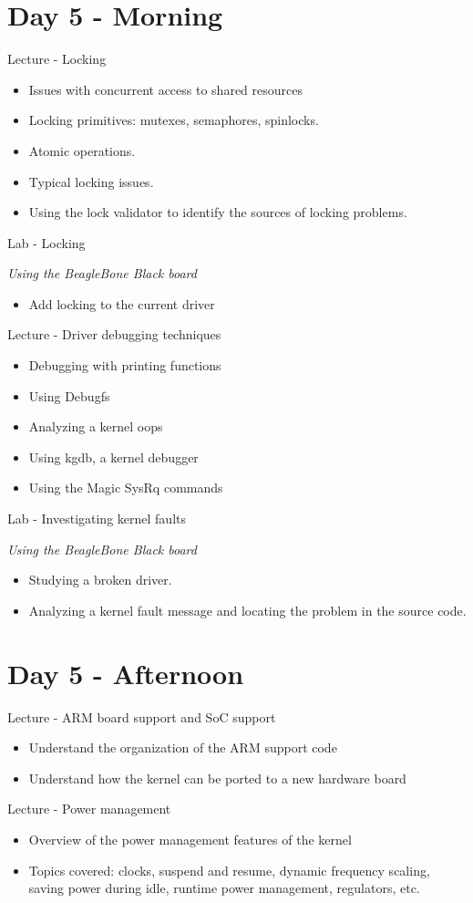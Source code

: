\documentclass[a4paper,12pt,obeyspaces,spaces,hyphens]{article}
\begin{document}
\section{Day 5 - Morning}

\feagendatwocolumn
{Lecture - Locking}
{
  \begin{itemize}
  \item Issues with concurrent access to shared resources
  \item Locking primitives: mutexes, semaphores, spinlocks.
  \item Atomic operations.
  \item Typical locking issues.
  \item Using the lock validator to identify the sources of locking
    problems.
  \end{itemize}
}
{Lab - Locking}
{
  {\em Using the BeagleBone Black board}
  \begin{itemize}
  \item Add locking to the current driver
  \end{itemize}
}

\feagendatwocolumn
{Lecture - Driver debugging techniques}
{
  \begin{itemize}
  \item Debugging with printing functions
  \item Using Debugfs
  \item Analyzing a kernel oops
  \item Using kgdb, a kernel debugger
  \item Using the Magic SysRq commands
  \end{itemize}
}
{Lab - Investigating kernel faults}
{
  {\em Using the BeagleBone Black board}
  \begin{itemize}
  \item Studying a broken driver.
  \item Analyzing a kernel fault message and locating the problem in the
    source code.
  \end{itemize}
}

\section{Day 5 - Afternoon}

\feagendatwocolumn
{Lecture - ARM board support and SoC support}
{
  \begin{itemize}
  \item Understand the organization of the ARM support code
  \item Understand how the kernel can be ported to a new hardware
    board
  \end{itemize}
}
{Lecture - Power management}
{
  \begin{itemize}
  \item Overview of the power management features of the kernel
  \item Topics covered: clocks, suspend and resume, dynamic frequency
    scaling, saving power during idle, runtime power management,
    regulators, etc.
  \end{itemize}
}
\end{document}
